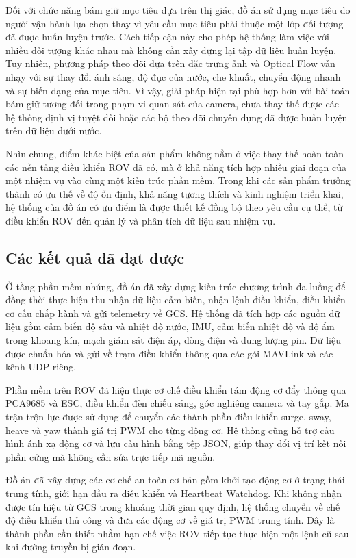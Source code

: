 \documentclass[../DoAn.tex]{subfiles}
\begin{document}
Đối với chức năng bám giữ mục tiêu dựa trên thị giác, đồ án sử dụng mục tiêu do người vận hành lựa chọn thay vì yêu cầu mục tiêu phải thuộc một lớp đối tượng đã được huấn luyện trước. Cách tiếp cận này cho phép hệ thống làm việc với nhiều đối tượng khác nhau mà không cần xây dựng lại tập dữ liệu huấn luyện. Tuy nhiên, phương pháp theo dõi dựa trên đặc trưng ảnh và Optical Flow vẫn nhạy với sự thay đổi ánh sáng, độ đục của nước, che khuất, chuyển động nhanh và sự biến dạng của mục tiêu. Vì vậy, giải pháp hiện tại phù hợp hơn với bài toán bám giữ tương đối trong phạm vi quan sát của camera, chưa thay thế được các hệ thống định vị tuyệt đối hoặc các bộ theo dõi chuyên dụng đã được huấn luyện trên dữ liệu dưới nước.

Nhìn chung, điểm khác biệt của sản phẩm không nằm ở việc thay thế hoàn toàn các nền tảng điều khiển ROV đã có, mà ở khả năng tích hợp nhiều giai đoạn của một nhiệm vụ vào cùng một kiến trúc phần mềm. Trong khi các sản phẩm trưởng thành có ưu thế về độ ổn định, khả năng tương thích và kinh nghiệm triển khai, hệ thống của đồ án có ưu điểm là được thiết kế đồng bộ theo yêu cầu cụ thể, từ điều khiển ROV đến quản lý và phân tích dữ liệu sau nhiệm vụ.

\subsection{Các kết quả đã đạt được}

Ở tầng phần mềm nhúng, đồ án đã xây dựng kiến trúc chương trình đa luồng để đồng thời thực hiện thu nhận dữ liệu cảm biến, nhận lệnh điều khiển, điều khiển cơ cấu chấp hành và gửi telemetry về GCS. Hệ thống đã tích hợp các nguồn dữ liệu gồm cảm biến độ sâu và nhiệt độ nước, IMU, cảm biến nhiệt độ và độ ẩm trong khoang kín, mạch giám sát điện áp, dòng điện và dung lượng pin. Dữ liệu được chuẩn hóa và gửi về trạm điều khiển thông qua các gói MAVLink và các kênh UDP riêng.

Phần mềm trên ROV đã hiện thực cơ chế điều khiển tám động cơ đẩy thông qua PCA9685 và ESC, điều khiển đèn chiếu sáng, góc nghiêng camera và tay gắp. Ma trận trộn lực được sử dụng để chuyển các thành phần điều khiển surge, sway, heave và yaw thành giá trị PWM cho từng động cơ. Hệ thống cũng hỗ trợ cấu hình ánh xạ động cơ và lưu cấu hình bằng tệp JSON, giúp thay đổi vị trí kết nối phần cứng mà không cần sửa trực tiếp mã nguồn.

Đồ án đã xây dựng các cơ chế an toàn cơ bản gồm khởi tạo động cơ ở trạng thái trung tính, giới hạn đầu ra điều khiển và Heartbeat Watchdog. Khi không nhận được tín hiệu từ GCS trong khoảng thời gian quy định, hệ thống chuyển về chế độ điều khiển thủ công và đưa các động cơ về giá trị PWM trung tính. Đây là thành phần cần thiết nhằm hạn chế việc ROV tiếp tục thực hiện một lệnh cũ sau khi đường truyền bị gián đoạn.
\end{document}
